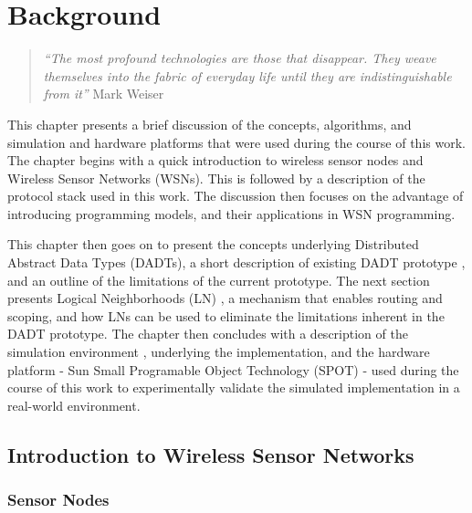 \chapter{Background}

\begin{quote}
\emph{``The most profound technologies are those that disappear. They weave
themselves into the fabric of everyday life until they are indistinguishable
from it''} 
Mark Weiser \cite{Weiser_ComputerIn21stCentury}
\end{quote}


This chapter presents a brief discussion of the concepts, algorithms, and 
simulation and hardware platforms that were used
during the course of this work. The chapter begins with a quick introduction to 
wireless sensor nodes and Wireless Sensor Networks (WSNs). This is followed by a
description of the protocol stack used in this work. The discussion
then focuses on the advantage of introducing programming models, and their
applications in WSN programming.

This chapter then goes on to present the concepts underlying
Distributed Abstract Data Types (DADTs), a short 
description of existing DADT prototype \cite{migliavacca_DADT:2006}, and  an
outline
of the limitations of the current prototype. The next section presents 
Logical Neighborhoods (LN) \cite{mottola_LNScoping:2006}, a mechanism that
enables routing and scoping, and how LNs can be used to eliminate the
limitations inherent in the DADT prototype. The chapter then concludes 
with a description of the simulation environment \cite{barr_JIST:2005}, \cite{barr_SWANS} underlying the 
implementation, and the hardware platform - Sun Small Programable Object
Technology (SPOT) \cite{simon_squawk:2006} - used during the course of this work
to experimentally validate the simulated implementation in a
real-world environment. 

\section{Introduction to Wireless Sensor Networks}

\subsection{Sensor Nodes} \label{subsec:sensornodes}

